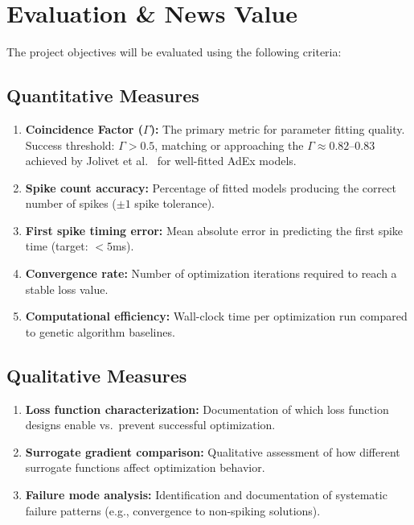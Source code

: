 \documentclass{article}
\begin{document}
\section{Evaluation \& News Value}

The project objectives will be evaluated using the following criteria:

\subsection{Quantitative Measures}

\begin{enumerate}
  \item \textbf{Coincidence Factor ($\Gamma$):} The primary metric for parameter fitting quality. Success threshold: $\Gamma > 0.5$, matching or approaching the $\Gamma \approx 0.82$--$0.83$ achieved by Jolivet et al.\ \cite{Jolivet2008} for well-fitted AdEx models.
    \item \textbf{Spike count accuracy:} Percentage of fitted models producing the correct number of spikes ($\pm 1$ spike tolerance).
    \item \textbf{First spike timing error:} Mean absolute error in predicting the first spike time (target: $<5$ms).
    \item \textbf{Convergence rate:} Number of optimization iterations required to reach a stable loss value.
    \item \textbf{Computational efficiency:} Wall-clock time per optimization run compared to genetic algorithm baselines.
\end{enumerate}

\subsection{Qualitative Measures}

\begin{enumerate}
    \item \textbf{Loss function characterization:} Documentation of which loss function designs enable vs.\ prevent successful optimization.
    \item \textbf{Surrogate gradient comparison:} Qualitative assessment of how different surrogate functions affect optimization behavior.
    \item \textbf{Failure mode analysis:} Identification and documentation of systematic failure patterns (e.g., convergence to non-spiking solutions).
\end{enumerate}
\end{document}
